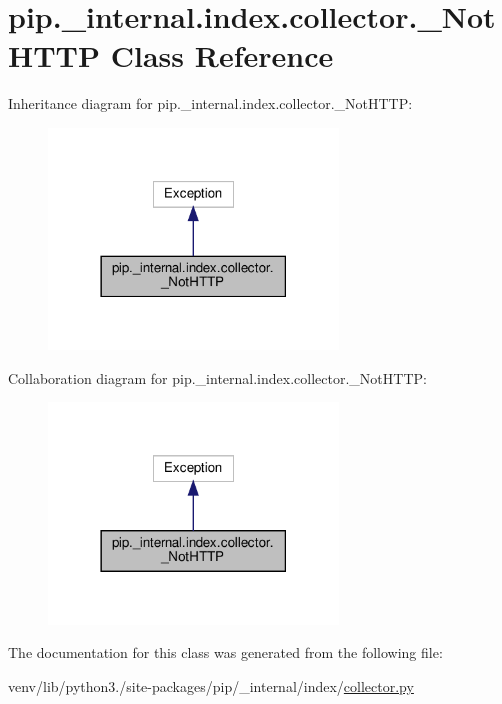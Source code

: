 \hypertarget{classpip_1_1__internal_1_1index_1_1collector_1_1__NotHTTP}{}\section{pip.\+\_\+internal.\+index.\+collector.\+\_\+\+Not\+H\+T\+TP Class Reference}
\label{classpip_1_1__internal_1_1index_1_1collector_1_1__NotHTTP}


Inheritance diagram for pip.\+\_\+internal.\+index.\+collector.\+\_\+\+Not\+H\+T\+TP\+:
\nopagebreak
\begin{figure}[H]
\begin{center}
\leavevmode
\includegraphics[width=218pt]{classpip_1_1__internal_1_1index_1_1collector_1_1__NotHTTP__inherit__graph}
\end{center}
\end{figure}


Collaboration diagram for pip.\+\_\+internal.\+index.\+collector.\+\_\+\+Not\+H\+T\+TP\+:
\nopagebreak
\begin{figure}[H]
\begin{center}
\leavevmode
\includegraphics[width=218pt]{classpip_1_1__internal_1_1index_1_1collector_1_1__NotHTTP__coll__graph}
\end{center}
\end{figure}


The documentation for this class was generated from the following file\+:\begin{DoxyCompactItemize}
\item 
venv/lib/python3./site-\/packages/pip/\+\_\+internal/index/\hyperlink{collector_8py}{collector.\+py}\end{DoxyCompactItemize}
